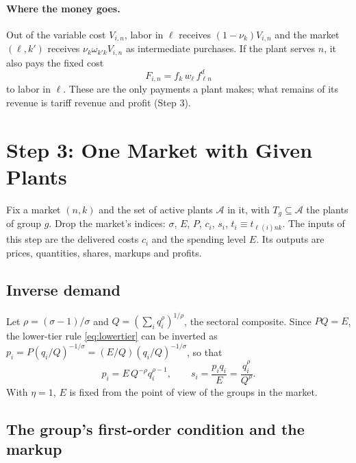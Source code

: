 \documentclass[11pt]{article}
\theoremstyle{remark}
\newcommand{\cA}{\mathcal A}
\begin{document}
\paragraph{Where the money goes.} Out of the variable cost $V_{i,n}$, labor in $\ell$
receives $(1-\nu_k)V_{i,n}$ and the market $(\ell,k')$ receives
$\nu_k\omega_{k'k}V_{i,n}$ as intermediate purchases. If the plant serves $n$, it
also pays the fixed cost
\begin{equation}
  F_{i,n}=f_k\,w_\ell\,f^d_{\ell n}
  \label{eq:fixed}
\end{equation}
to labor in $\ell$. These are the only payments a plant makes; what remains of its
revenue is tariff revenue and profit (Step 3).

\section{Step 3: One Market with Given Plants}
\label{sec:market}

Fix a market $(n,k)$ and the set of active plants $\cA$ in it, with $T_g\subseteq\cA$
the plants of group $g$. Drop the market's indices: $\sigma$, $E$, $P$, $c_i$, $s_i$,
$t_i\equiv t_{\ell(i)nk}$. The inputs of this step are the delivered costs $c_i$ and
the spending level $E$. Its outputs are prices, quantities, shares, markups and
profits.

\subsection{Inverse demand}

Let $\rho=(\sigma-1)/\sigma$ and $Q=(\sum_iq_i^\rho)^{1/\rho}$, the sectoral composite.
Since $PQ=E$, the lower-tier rule \eqref{eq:lowertier} can be inverted as
$p_i=P(q_i/Q)^{-1/\sigma}=(E/Q)(q_i/Q)^{-1/\sigma}$, so that
\begin{equation}
  p_i=E\,Q^{-\rho}q_i^{\rho-1},
  \qquad
  s_i=\frac{p_iq_i}{E}=\frac{q_i^\rho}{Q^\rho} .
  \label{eq:inverse}
\end{equation}
With $\eta=1$, $E$ is fixed from the point of view of the groups in the market.

\subsection{The group's first-order condition and the markup}
\end{document}
